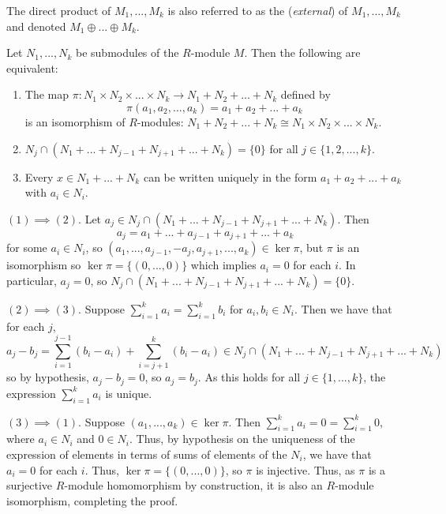 \documentclass[12pt, a4paper, twoside, openright, titlepage]{book}
\begin{document}
The direct product of $M_1,...,M_k$ is also referred to as the (\emph{external})  of $M_1,...,M_k$ and denoted $M_1\oplus ... \oplus M_k$. 

\begin{prop}{}{}
    Let $N_1,...,N_k$ be submodules of the $R$-module $M$. Then the following are equivalent: \begin{enumerate}
        \item The map $\pi:N_1\times N_2\times ... \times N_k\rightarrow N_1+N_2+...+N_k$ defined by \begin{equation*}
                \pi(a_1,a_2,...,a_k) = a_1+a_2+...+a_k
        \end{equation*}
            is an isomorphism of $R$-modules: $N_1+N_2+...+N_k\cong N_1\times N_2\times ...\times N_k$.
        \item $N_j\cap(N_1+...+N_{j-1}+N_{j+1}+...+N_k) = \{0\}$ for all $j \in \{1,2,...,k\}$.
        \item Every $x \in N_1+...+N_k$ can be written uniquely in the form $a_1+a_2+...+a_k$ with $a_i \in N_i$.
    \end{enumerate}
\end{prop}
\begin{proof*}{}{}
    $(1)\implies (2)$. Let $a_j \in N_j\cap(N_1+...+N_{j-1}+N_{j+1}+...+N_k)$. Then \begin{equation*}
        a_j = a_1+...+a_{j-1}+a_{j+1}+...+a_k
    \end{equation*}
    for some $a_i \in N_i$, so $(a_1,...,a_{j-1},-a_j,a_{j+1},...,a_k) \in \ker \pi$, but $\pi$ is an isomorphism so $\ker\pi = \{(0,...,0)\}$ which implies $a_i = 0$ for each $i$. In particular, $a_j = 0$, so $N_j\cap(N_1+...+N_{j-1}+N_{j+1}+...+N_k) = \{0\}$.

    $(2)\implies (3)$. Suppose $\sum_{i=1}^ka_i = \sum_{i=1}^kb_i$ for $a_i,b_i \in N_i$. Then we have that for each $j$, $$a_j-b_j = \sum_{i=1}^{j-1}(b_i-a_i)+\sum_{i=j+1}^k(b_i-a_i) \in N_j\cap(N_1+...+N_{j-1}+N_{j+1}+...+N_k)$$ so by hypothesis, $a_j -b_j = 0$, so $a_j = b_j$. As this holds for all $j \in \{1,...,k\}$, the expression $\sum_{i=1}^ka_i$ is unique.

    $(3)\implies (1)$. Suppose $(a_1,...,a_k) \in \ker\pi$. Then $\sum_{i=1}^ka_i = 0 = \sum_{i=1}^k0$, where $a_i \in N_i$ and $0 \in N_i$. Thus, by hypothesis on the uniqueness of the expression of elements in terms of sums of elements of the $N_i$, we have that $a_i = 0$ for each $i$. Thus, $\ker\pi = \{(0,...,0)\}$, so $\pi$ is injective. Thus, as $\pi$ is a surjective $R$-module homomorphism by construction, it is also an $R$-module isomorphism, completing the proof.
\end{proof*}
\end{document}
